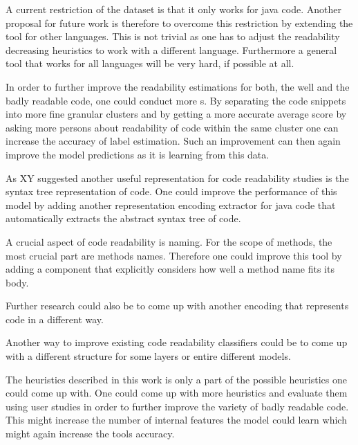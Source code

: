 \documentclass[%
class=scrreprt,
chapterprefix=false,%
open=right,%
twoside=false,%
paper=a4,%
logofile={Logo\_zentral\_farbig\_EN.png},%
thesistype=master,%
UKenglish,%
]{se2thesis}
\begin{document}
	A current restriction of the dataset is that it only works for java code. Another proposal for future work is therefore to overcome this restriction by extending the tool for other languages. This is not trivial as one has to adjust the readability decreasing heuristics to work with a different language. Furthermore a general tool that works for all languages will be very hard, if possible at all.
	
	In order to further improve the readability estimations for both, the well and the badly readable code, one could conduct more s. By separating the code snippets into more fine granular clusters and by getting a more accurate average score by asking more persons about readability of code within the same cluster one can increase the accuracy of label estimation. Such an improvement can then again improve the model predictions as it is learning from this data.
	
	As XY suggested another useful representation for code readability studies is the syntax tree representation of code. One could improve the performance of this model by adding another representation encoding extractor for java code that automatically extracts the abstract syntax tree of code. 
	
	A crucial aspect of code readability is naming. For the scope of methods, the most crucial part are methods names. Therefore one could improve this tool by adding a component that explicitly considers how well a method name fits its body.
	
	Further research could also be to come up with another encoding that represents code in a different way.
	
	Another way to improve existing code readability classifiers could be to come up with a different structure for some layers or entire different models.
	
	The heuristics described in this work is only a part of the possible heuristics one could come up with. One could come up with more heuristics and evaluate them using user studies in order to further improve the variety of badly readable code. This might increase the number of internal features the model could learn which might again increase the tools accuracy.

	
	\backmatter
	
	\printbibliography
	
\end{document}
